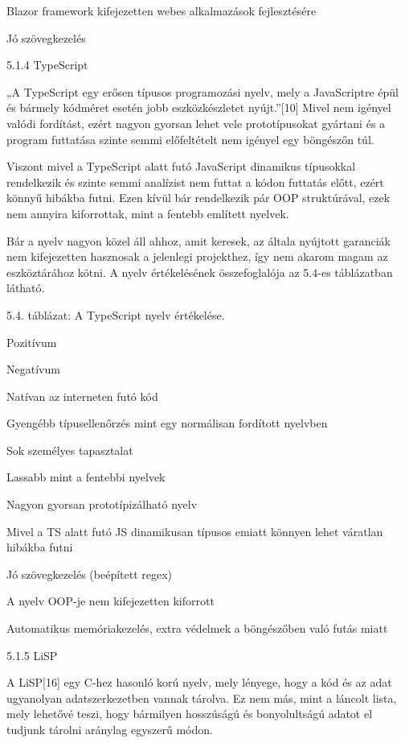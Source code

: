 Blazor framework kifejezetten webes alkalmazások fejlesztésére



Jó szövegkezelés





5.1.4 TypeScript

„A TypeScript egy erősen típusos programozási nyelv, mely a JavaScriptre épül és bármely kódméret esetén jobb eszközkészletet nyújt.”[10] Mivel nem igényel valódi fordítást, ezért nagyon gyorsan lehet vele prototípusokat gyártani és a program futtatása szinte semmi előfeltételt nem igényel egy böngészőn túl.

Viszont mivel a TypeScript alatt futó JavaScript dinamikus típusokkal rendelkezik és szinte semmi analízist nem futtat a kódon futtatás előtt, ezért könnyű hibákba futni. Ezen kívül bár rendelkezik pár OOP struktúrával, ezek nem annyira kiforrottak, mint a fentebb említett nyelvek.

Bár a nyelv nagyon közel áll ahhoz, amit keresek, az általa nyújtott garanciák nem kifejezetten hasznosak a jelenlegi projekthez, így nem akarom magam az eszköztárához kötni. A nyelv értékelésének összefoglalója az 5.4-es táblázatban látható.

5.4. táblázat: A TypeScript nyelv értékelése.

Pozitívum

Negatívum

Natívan az interneten futó kód

Gyengébb típusellenőrzés mint egy normálisan fordított nyelvben

Sok személyes tapasztalat

Lassabb mint a fentebbi nyelvek

Nagyon gyorsan prototípizálható nyelv

Mivel a TS alatt futó JS dinamikusan típusos emiatt könnyen lehet váratlan hibákba futni

Jó szövegkezelés (beépített regex)

A nyelv OOP-je nem kifejezetten kiforrott

Automatikus memóriakezelés, extra védelmek a böngészőben való futás miatt





5.1.5 LiSP

A LiSP[16] egy C-hez hasonló korú nyelv, mely lényege, hogy a kód és az adat ugyanolyan adatszerkezetben vannak tárolva. Ez nem más, mint a láncolt lista, mely lehetővé teszi, hogy bármilyen hosszúságú és bonyolultságú adatot el tudjunk tárolni aránylag egyszerű módon.

